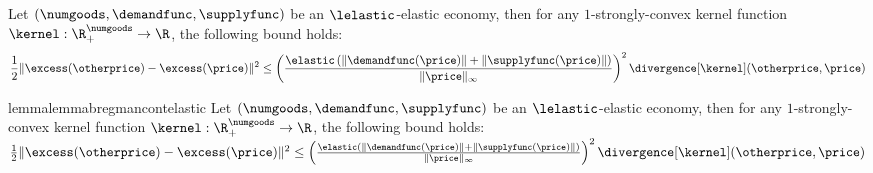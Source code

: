 \begin{lemma}\label{lemma:bregman_cont_elastic}
    Let $(\numgoods, \demandfunc, \supplyfunc)$ be an $\lelastic$-elastic economy, then for any $1$-strongly-convex kernel function $\kernel: \R^\numgoods_+ \to \R$, the following bound holds:
    \begin{align*}
        \frac{1}{2}\| \excess(\otherprice) - \excess(\price) \|^2 \leq \left(\frac{\elastic \left(\|\demandfunc(\price)\| + \|\supplyfunc(\price)\| \right)}{\|\price\|_\infty} \right)^2 \divergence[\kernel](\otherprice,\price)
    \end{align*}
\end{lemma}
\fi
\begin{restatable}{lemma}{lemmabregmancontelastic}\label{lemma:bregman_cont_elastic}
        Let $(\numgoods, \demandfunc, \supplyfunc)$ be an $\lelastic$-elastic economy, then for any $1$-strongly-convex kernel function $\kernel: \R^\numgoods_+ \to \R$, the following bound holds:
$
        \frac{1}{2}\| \excess(\otherprice) - \excess(\price) \|^2 \leq \left(\frac{\elastic \left(\|\demandfunc(\price)\| + \|\supplyfunc(\price)\| \right)}{\|\price\|_\infty} \right)^2 \divergence[\kernel](\otherprice,\price)
$
\end{restatable}


